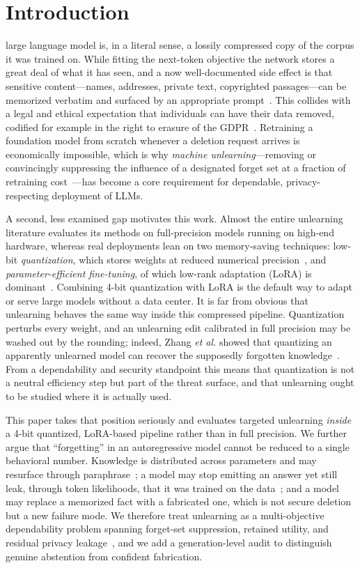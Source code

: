 \documentclass[journal]{IEEEtran}
\begin{document}
\section{Introduction}
 large language model is, in a literal sense, a lossily compressed copy of the corpus it was trained on. While fitting the next-token objective the network stores a great deal of what it has seen, and a now well-documented side effect is that sensitive content---names, addresses, private text, copyrighted passages---can be memorized verbatim and surfaced by an appropriate prompt~\cite{carlini2021extracting}. This collides with a legal and ethical expectation that individuals can have their data removed, codified for example in the right to erasure of the GDPR~\cite{gdpr2016}. Retraining a foundation model from scratch whenever a deletion request arrives is economically impossible, which is why \emph{machine unlearning}---removing or convincingly suppressing the influence of a designated forget set at a fraction of retraining cost~\cite{cao2015unlearning,bourtoule2021machine}---has become a core requirement for dependable, privacy-respecting deployment of LLMs.

A second, less examined gap motivates this work. Almost the entire unlearning literature evaluates its methods on full-precision models running on high-end hardware, whereas real deployments lean on two memory-saving techniques: low-bit \emph{quantization}, which stores weights at reduced numerical precision~\cite{dettmers2022int8,dettmers2023qlora}, and \emph{parameter-efficient fine-tuning}, of which low-rank adaptation (LoRA) is dominant~\cite{hu2022lora}. Combining 4-bit quantization with LoRA is the default way to adapt or serve large models without a data center. It is far from obvious that unlearning behaves the same way inside this compressed pipeline. Quantization perturbs every weight, and an unlearning edit calibrated in full precision may be washed out by the rounding; indeed, Zhang \emph{et al.} showed that quantizing an apparently unlearned model can recover the supposedly forgotten knowledge~\cite{zhang2024quantization}. From a dependability and security standpoint this means that quantization is not a neutral efficiency step but part of the threat surface, and that unlearning ought to be studied where it is actually used.

This paper takes that position seriously and evaluates targeted unlearning \emph{inside} a 4-bit quantized, LoRA-based pipeline rather than in full precision. We further argue that ``forgetting'' in an autoregressive model cannot be reduced to a single behavioral number. Knowledge is distributed across parameters and may resurface through paraphrase~\cite{eldan2023harrypotter}; a model may stop emitting an answer yet still leak, through token likelihoods, that it was trained on the data~\cite{shi2024minkprob}; and a model may replace a memorized fact with a fabricated one, which is not secure deletion but a new failure mode. We therefore treat unlearning as a multi-objective dependability problem spanning forget-set suppression, retained utility, and residual privacy leakage~\cite{liu2024rethinking}, and we add a generation-level audit to distinguish genuine abstention from confident fabrication.
\end{document}
